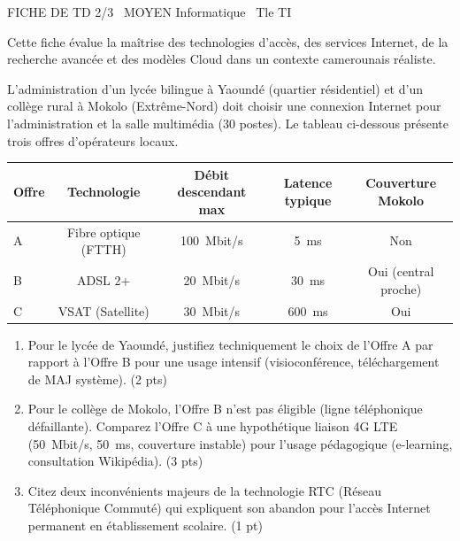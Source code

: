 \documentclass[11pt]{article}
\begin{document}
\begin{tcolorbox}[enhanced,colback=popink,colframe=popink,arc=10pt,boxrule=0pt,left=12pt,right=12pt,top=9pt,bottom=9pt]
{\color{white}\popxbold\small FICHE DE TD 2/3 \textbullet\ MOYEN \hfill Informatique \textbullet\ Tle TI\par}
\end{tcolorbox}
\vspace{4pt}
\noindent Cette fiche évalue la maîtrise des technologies d'accès, des services Internet, de la recherche avancée et des modèles Cloud dans un contexte camerounais réaliste.

\begin{exercice}
L'administration d'un lycée bilingue à Yaoundé (quartier résidentiel) et d'un collège rural à Mokolo (Extrême-Nord) doit choisir une connexion Internet pour l'administration et la salle multimédia (30 postes). Le tableau ci-dessous présente trois offres d'opérateurs locaux.

\begin{tabularx}{\linewidth}{|X|c|c|c|c|}
\hline
\textbf{Offre} & \textbf{Technologie} & \textbf{Débit descendant max} & \textbf{Latence typique} & \textbf{Couverture Mokolo} \\
\hline
A & Fibre optique (FTTH) & \SI{100}{Mbit/s} & \SI{5}{ms} & Non \\
B & ADSL 2+ & \SI{20}{Mbit/s} & \SI{30}{ms} & Oui (central proche) \\
C & VSAT (Satellite) & \SI{30}{Mbit/s} & \SI{600}{ms} & Oui \\
\hline
\end{tabularx}

\begin{enumerate}
    \item Pour le lycée de Yaoundé, justifiez techniquement le choix de l'Offre A par rapport à l'Offre B pour une usage intensif (visioconférence, téléchargement de MAJ système). \hfill (2 pts)
    \item Pour le collège de Mokolo, l'Offre B n'est pas éligible (ligne téléphonique défaillante). Comparez l'Offre C à une hypothétique liaison 4G LTE (\SI{50}{Mbit/s}, \SI{50}{ms}, couverture instable) pour l'usage pédagogique (e-learning, consultation Wikipédia). \hfill (3 pts)
    \item Citez deux inconvénients majeurs de la technologie RTC (Réseau Téléphonique Commuté) qui expliquent son abandon pour l'accès Internet permanent en établissement scolaire. \hfill (1 pt)
\end{enumerate}
\end{exercice}
\end{document}
